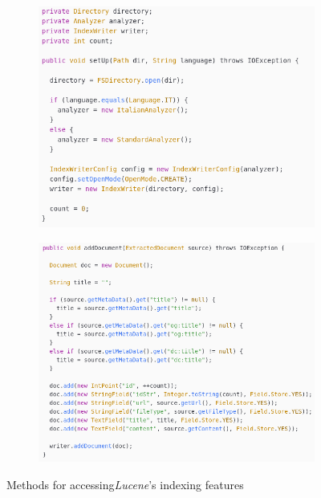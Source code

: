 \documentclass[a4paper]{usiinfbachelorproject}
\begin{document}
\begin{figure}[h]
     
     \centering
     \begin{subfigure}[b]{0.45\textwidth}
         \centering
         \includegraphics[width=\textwidth]{figures/indexerCode1}
     \end{subfigure}
     \begin{subfigure}[b]{0.45\textwidth}
         \centering
         \includegraphics[width=\textwidth]{figures/indexerCode2}
     \end{subfigure}
     \caption{Methods for accessing\emph{Lucene}'s indexing features}
     \label{fig:indexerCode}

\end{figure}
\end{document}
